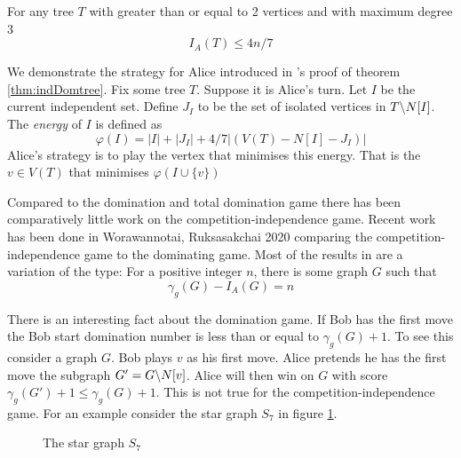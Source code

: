 \begin{theorem}    \label{thm:indDomtree}
For any tree $T$ with greater than or equal to 2 vertices and with maximum degree 3 
\[I_A(T)\leq 4n/7\]
\end{theorem}

We demonstrate the strategy for Alice introduced in \cite{GoddardHenning2018}'s proof of theorem \ref{thm:indDomtree}. Fix some tree $T$. Suppose it is Alice's turn. Let $I$ be the current independent set. Define $J_I$ to be the set of isolated vertices in $T\backslash N[I]$. The \textit{energy} of $I$ is defined as 
    \[\varphi(I) = |I| + |J_I| + 4/7|(V(T) - N[I] - J_I)|\]
 Alice's strategy is to play the vertex  that minimises this energy. That is the $v\in V(T)$ that minimises $\varphi(I\cup\{v\})$

Compared to the domination and total domination game there has been comparatively little work on the competition-independence game. 
Recent work has been done in Worawannotai, Ruksasakchai 2020 \cite{WorRuk2020} comparing the competition-independence game to the dominating game. Most of the results in \cite{WorRuk2020} are a variation of the type: For a positive integer $n$, there is some graph $G$ such that
\[\gamma_g(G) - I_A(G) = n\]

There is an interesting fact about the domination game. If Bob has the first move the Bob start domination number is less than or equal to $\gamma_g(G) +1$. To see this consider a graph $G$. Bob plays $v$ as his first move. Alice pretends he has the first move the subgraph $G'=G\backslash N[v]$. Alice will then win on $G$ with score $\gamma_g(G')+1\leq \gamma_g(G)+1$.   
This is not true for the competition-independence game. For an example consider the star graph $S_7$ in figure \ref{fig:starS7}. 

\begin{figure}[h]
    \centering
    \caption{The star graph $S_7$}
    \label{fig:starS7}
\end{figure}

